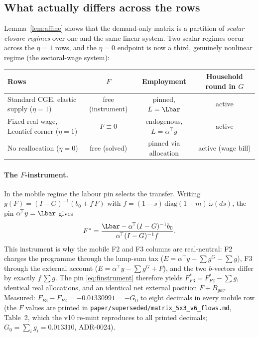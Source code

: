 \subsection{What actually differs across the rows}\label{sec:gauge}

Lemma~\ref{lem:affine} shows that the demand-only matrix is a partition of
\emph{scalar closure regimes} over one and the same linear system.
Two scalar regimes occur across the $\eta = 1$
rows, and the $\eta = 0$ endpoint is now a third, genuinely nonlinear
regime (the sectoral-wage system):

\begin{center}
{\small
\begin{tabular}{lccc}
\toprule
Rows & $F$ & Employment & Household round in $G$ \\
\midrule
Standard CGE, elastic supply ($\eta = 1$) & free (instrument) & pinned, $L = \Lbar$ & active \\
Fixed real wage, Leontief corner ($\eta = 1$) & $F \equiv 0$ & endogenous, $L = \alpha^{\!\top}y$ & active \\
No reallocation ($\eta = 0$) & free (solved) & pinned via allocation & active (wage bill) \\
\bottomrule
\end{tabular}
}
\end{center}

\paragraph{The $F$-instrument.} In the mobile regime the labour pin selects
the transfer. Writing $y(F) = (I-G)^{-1}(b_0 + f\,F)$ with
$f = (1-s)\,\mathrm{diag}(1-m)\,\tilde\omega(ds)$, the pin
$\alpha^{\!\top}y = \Lbar$ gives
\begin{equation}
F^{\ast} = \frac{\Lbar - \alpha^{\!\top}(I-G)^{-1} b_0}
               {\alpha^{\!\top}(I-G)^{-1} f}.
\label{eq:finstrument}
\end{equation}
This instrument is why the mobile F2 and F3 columns are real-neutral: F2
charges the programme through the lump-sum tax ($E = \alpha^{\!\top}y -
\sum g^G - \sum g$), F3 through the external account ($E = \alpha^{\!\top}y
- \sum g^G + F$), and the two $b$-vectors differ by exactly
$f\,\sum g$. The pin \eqref{eq:finstrument} therefore yields
$F^{\ast}_{F3} = F^{\ast}_{F2} - \sum g$, identical real allocations, and
an identical net external position $F + B_{gov}$. Measured: $F_{F3} - F_{F2} = -0.01330991 = -G_0$ to eight
decimals in every mobile row (the $F$ values are printed
in \texttt{paper/superseded/matrix\_5x3\_v6\_flows.md}, Table~2, which the v10
re-mint reproduces to all printed decimals; $G_0 = \sum_i g_i = 0.013310$,
ADR-0024).

